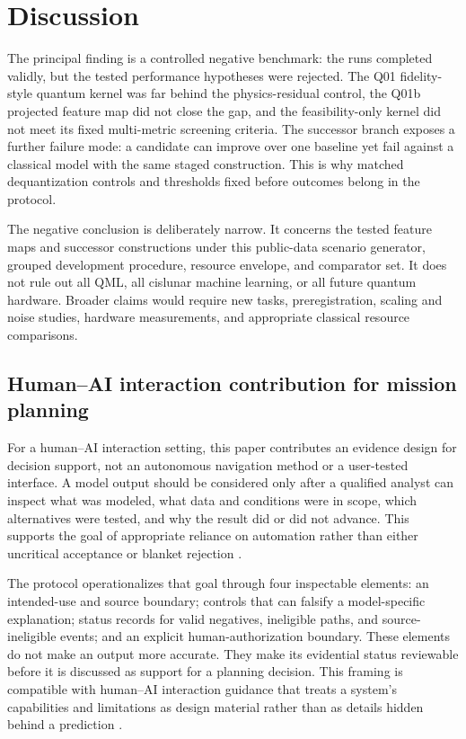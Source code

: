 \section{Discussion}
\label{sec:discussion}

The principal finding is a controlled negative benchmark: the runs completed
validly, but the tested performance hypotheses were rejected. The Q01
fidelity-style quantum kernel was far behind the physics-residual control, the
Q01b projected feature map did not close the gap, and the feasibility-only
kernel did not meet its fixed multi-metric screening criteria. The successor
branch exposes a further failure mode: a candidate can improve over one
baseline yet fail against a classical model with the same staged construction.
This is why matched dequantization controls and thresholds fixed before
outcomes belong in the protocol.

The negative conclusion is deliberately narrow. It concerns the tested feature
maps and successor constructions under this public-data scenario generator,
grouped development procedure, resource envelope, and comparator set. It does
not rule out all QML, all cislunar machine learning, or all future quantum
hardware. Broader claims would require new tasks, preregistration, scaling and
noise studies, hardware measurements, and appropriate classical resource
comparisons.

\subsection{Human--AI interaction contribution for mission planning}

For a human--AI interaction setting, this paper contributes an evidence design
for decision support, not an autonomous navigation method or a user-tested
interface. A model output should be considered only after a qualified analyst
can inspect what was modeled, what data and conditions were in scope, which
alternatives were tested, and why the result did or did not advance. This
supports the goal of appropriate reliance on automation rather than either
uncritical acceptance or blanket rejection \cite{lee2004}.

The protocol operationalizes that goal through four inspectable elements:
an intended-use and source boundary; controls that can falsify a
model-specific explanation; status records for valid negatives, ineligible
paths, and source-ineligible events; and an explicit human-authorization
boundary. These elements do not make an output more accurate. They make its
evidential status reviewable before it is discussed as support for a planning
decision. This framing is compatible with human--AI interaction guidance that
treats a system's capabilities and limitations as design material rather than
as details hidden behind a prediction \cite{amershi2019}.

